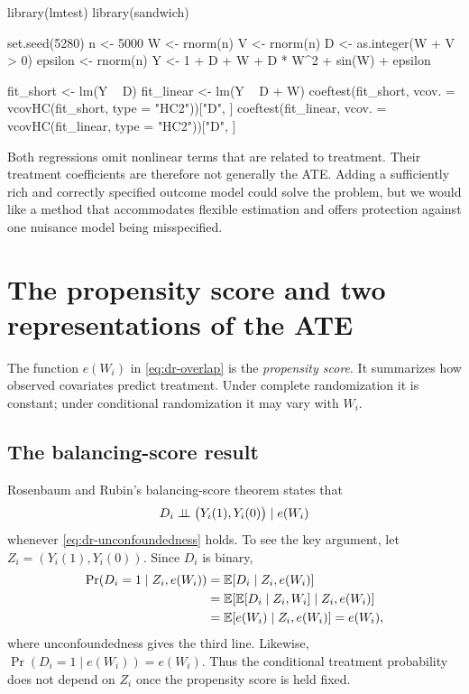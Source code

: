 \begin{rcode}
library(lmtest)
library(sandwich)

set.seed(5280)
n <- 5000
W <- rnorm(n)
V <- rnorm(n)
D <- as.integer(W + V > 0)
epsilon <- rnorm(n)
Y <- 1 + D + W + D * W^2 + sin(W) + epsilon

fit_short <- lm(Y ~ D)
fit_linear <- lm(Y ~ D + W)
coeftest(fit_short, vcov. = vcovHC(fit_short, type = "HC2"))["D", ]
coeftest(fit_linear, vcov. = vcovHC(fit_linear, type = "HC2"))["D", ]
\end{rcode}

Both regressions omit nonlinear terms that are related to treatment.  Their treatment
coefficients are therefore not generally the ATE.  Adding a sufficiently rich and
correctly specified outcome model could solve the problem, but we would like a
method that accommodates flexible estimation and offers protection against one
nuisance model being misspecified.

\section{The propensity score and two representations of the ATE}
\label{sec:dr-identification}

The function $e(W_i)$ in \eqref{eq:dr-overlap} is the \emph{propensity score}.  It
summarizes how observed covariates predict treatment.  Under complete randomization
it is constant; under conditional randomization it may vary with $W_i$.

\subsection{The balancing-score result}

Rosenbaum and Rubin's balancing-score theorem states that
\begin{equation}
  D_i\mathrel{\perp\!\!\!\perp}\bigl(Y_i(1),Y_i(0)\bigr)\mid e(W_i)
  \label{eq:dr-ps-unconfoundedness}
\end{equation}
whenever \eqref{eq:dr-unconfoundedness} holds.  To see the key argument, let
$Z_i=(Y_i(1),Y_i(0))$.  Since $D_i$ is binary,
\begin{align*}
  \Pr(D_i=1\mid Z_i,e(W_i))
  &=\mathbb{E}[D_i\mid Z_i,e(W_i)]\\
  &=\mathbb{E}\!\left[\mathbb{E}[D_i\mid Z_i,W_i]\mid Z_i,e(W_i)\right]\\
  &=\mathbb{E}[e(W_i)\mid Z_i,e(W_i)]
   =e(W_i),
\end{align*}
where unconfoundedness gives the third line.  Likewise,
$\Pr(D_i=1\mid e(W_i))=e(W_i)$.  Thus the conditional treatment probability does
not depend on $Z_i$ once the propensity score is held fixed.

